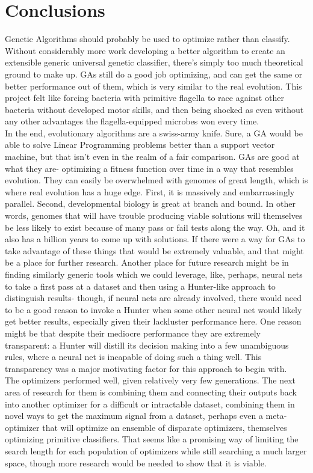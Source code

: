 \chapter{Conclusions} \label{ch:conclusion}
Genetic Algorithms should probably be used to optimize rather than classify.  Without considerably more work developing a better algorithm to create an extensible generic universal genetic classifier, there's simply too much theoretical ground to make up.  GAs still do a good job optimizing, and can get the same or better performance out of them, which is very similar to the real evolution.  This project felt like forcing bacteria with primitive flagella to race against other bacteria without developed motor skills, and then being shocked as even without any other advantages the flagella-equipped microbes won every time.\\In the end, evolutionary algorithms are a swiss-army knife.  Sure, a GA would be able to solve Linear Programming problems better than a support vector machine, but that isn't even in the realm of a fair comparison.  GAs are good at what they are- optimizing a fitness function over time in a way that resembles evolution.  They can easily be overwhelmed with genomes of great length, which is where real evolution has a huge edge.  First, it is massively and embarrassingly parallel.  Second, developmental biology is great at branch and bound.  In other words, genomes that will have trouble producing viable solutions will themselves be less likely to exist because of many pass or fail tests along the way.  Oh, and it also has a billion years to come up with solutions.  If there were a way for GAs to take advantage of these things that would be extremely valuable, and that might be a place for further research.  Another place for future research might be in finding similarly generic tools which we could leverage, like, perhaps, neural nets to take a first pass at a dataset and then using a Hunter-like approach to distinguish results- though, if neural nets are already involved, there would need to be a good reason to invoke a Hunter when some other neural net would likely get better results, especially given their lackluster performance here.  One reason might be that despite their mediocre performance they are extremely transparent: a Hunter will distill its decision making into a few unambiguous rules, where a neural net is incapable of doing such a thing well.  This transparency was a major motivating factor for this approach to begin with.\\
The optimizers performed well, given relatively very few generations.  The next area of research for them is combining them and connecting their outputs back into another optimizer for a difficult or intractable dataset, combining them in novel ways to get the maximum signal from a dataset, perhaps even a meta-optimizer that will optimize an ensemble of disparate optimizers, themselves optimizing primitive classifiers.  That seems like a promising way of limiting the search length for each population of optimizers while still searching a much larger space, though more research would be needed to show that it is viable.\\
